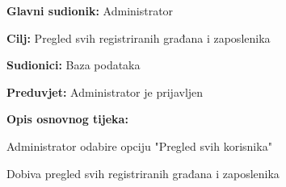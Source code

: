 				\noindent {}
				\begin{packed_item}
					
					\item \textbf{Glavni sudionik: }Administrator
					\item  \textbf{Cilj:} Pregled svih registriranih građana i zaposlenika
					\item  \textbf{Sudionici:} Baza podataka
					\item  \textbf{Preduvjet:} Administrator je prijavljen
					\item  \textbf{Opis osnovnog tijeka:}
					
					\item[] \begin{packed_enum}
						
						\item Administrator odabire opciju "Pregled svih korisnika"
						\item Dobiva pregled svih registriranih građana i zaposlenika
					\end{packed_enum}
				\end{packed_item}
			
				\newpage
				
